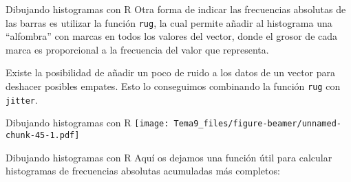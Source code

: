 \documentclass[
  ignorenonframetext,
]{beamer}
\newenvironment{Shaded}{\begin{snugshade}}{\end{snugshade}}
\newcommand{\CharTok}[1]{\textcolor[rgb]{0.31,0.60,0.02}{#1}}
\newcommand{\ControlFlowTok}[1]{\textcolor[rgb]{0.13,0.29,0.53}{\textbf{#1}}}
\newcommand{\DataTypeTok}[1]{\textcolor[rgb]{0.13,0.29,0.53}{#1}}
\newcommand{\DecValTok}[1]{\textcolor[rgb]{0.00,0.00,0.81}{#1}}
\newcommand{\KeywordTok}[1]{\textcolor[rgb]{0.13,0.29,0.53}{\textbf{#1}}}
\newcommand{\NormalTok}[1]{#1}
\newcommand{\OperatorTok}[1]{\textcolor[rgb]{0.81,0.36,0.00}{\textbf{#1}}}
\newcommand{\OtherTok}[1]{\textcolor[rgb]{0.56,0.35,0.01}{#1}}
\newcommand{\StringTok}[1]{\textcolor[rgb]{0.31,0.60,0.02}{#1}}
\begin{document}
\begin{frame}[fragile]{Dibujando histogramas con R}
\protect\hypertarget{dibujando-histogramas-con-r-5}{}
Otra forma de indicar las frecuencias absolutas de las barras es
utilizar la función \texttt{rug}, la cual permite añadir al histograma
una ``alfombra'' con marcas en todos los valores del vector, donde el
grosor de cada marca es proporcional a la frecuencia del valor que
representa.

Existe la posibilidad de añadir un poco de ruido a los datos de un
vector para deshacer posibles empates. Esto lo conseguimos combinando la
función \texttt{rug} con \texttt{jitter}.
\end{frame}

\begin{frame}{Dibujando histogramas con R}
\protect\hypertarget{dibujando-histogramas-con-r-6}{}
\texttt{[image: Tema9\_files/figure-beamer/unnamed-chunk-45-1.pdf]}
\end{frame}

\begin{frame}[fragile]{Dibujando histogramas con R}
\protect\hypertarget{dibujando-histogramas-con-r-7}{}
Aquí os dejamos una función útil para calcular histogramas de
frecuencias absolutas acumuladas más completos:

\begin{Shaded}
\end{Shaded}
\end{frame}
\end{document}
